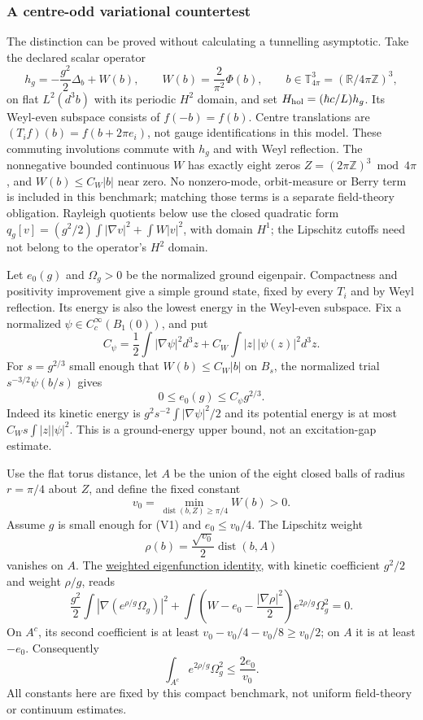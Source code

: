 \documentclass[11pt,a4paper]{article}
\begin{document}
\hypertarget{a-centre-odd-variational-countertest}{%
\subsubsection{A centre-odd variational
countertest}\label{a-centre-odd-variational-countertest}}

The distinction can be proved without calculating a tunnelling
asymptotic. Take the declared scalar operator
\[h_g=-\frac{g^2}{2}\Delta_b+W(b),\qquad
W(b)=\frac{2}{\pi^2}\Phi(b),\qquad
b\in\mathbb T_{4\pi}^3=(\mathbb R/4\pi\mathbb Z)^3,\] on flat
\(L^2(d^3b)\) with its periodic \(H^2\) domain, and set
\(H_{\rm hol}=(\hbar c/L)h_g\). Its Weyl-even subspace consists of
\(f(-b)=f(b)\). Centre translations are \((T_if)(b)=f(b+2\pi e_i)\), not
gauge identifications in this model. These commuting involutions commute
with \(h_g\) and with Weyl reflection. The nonnegative bounded
continuous \(W\) has exactly eight zeros
\(Z=(2\pi\mathbb Z)^3\bmod4\pi\), and \(W(b)\le C_W|b|\) near zero. No
nonzero-mode, orbit-measure or Berry term is included in this benchmark;
matching those terms is a separate field-theory obligation. Rayleigh
quotients below use the closed quadratic form
\(q_g[v]=(g^2/2)\int|\nabla v|^2+\int W|v|^2\), with domain \(H^1\); the
Lipschitz cutoffs need not belong to the operator's \(H^2\) domain.

Let \(e_0(g)\) and \(\Omega_g>0\) be the normalized ground eigenpair.
Compactness and positivity improvement give a simple ground state, fixed
by every \(T_i\) and by Weyl reflection. Its energy is also the lowest
energy in the Weyl-even subspace. Fix a normalized
\(\psi\in C_c^\infty(B_1(0))\), and put
\[C_\psi=\frac12\int|\nabla\psi|^2d^3z
+C_W\int|z|\,|\psi(z)|^2d^3z.\] For \(s=g^{2/3}\) small enough that
\(W(b)\le C_W|b|\) on \(B_s\), the normalized trial
\(s^{-3/2}\psi(b/s)\) gives \[0\le e_0(g)\le C_\psi g^{2/3}. \tag{V1}\]
Indeed its kinetic energy is \(g^2s^{-2}\int|\nabla\psi|^2/2\) and its
potential energy is at most \(C_Ws\int|z||\psi|^2\). This is a
ground-energy upper bound, not an excitation-gap estimate.

Use the flat torus distance, let \(A\) be the union of the eight closed
balls of radius \(r=\pi/4\) about \(Z\), and define the fixed constant
\[v_0=\min_{\operatorname{dist}(b,Z)\ge\pi/4}W(b)>0.\] Assume \(g\) is
small enough for (V1) and \(e_0\le v_0/4\). The Lipschitz weight
\[\rho(b)=\frac{\sqrt{v_0}}2\operatorname{dist}(b,A)\] vanishes on
\(A\). The
\href{ground-state-measure-transfer.md\#weighted-estimates-and-global-magnetic-tails}{weighted
eigenfunction identity}, with kinetic coefficient \(g^2/2\) and weight
\(\rho/g\), reads \[\frac{g^2}{2}\int|\nabla(e^{\rho/g}\Omega_g)|^2
+\int\left(W-e_0-\frac{|\nabla\rho|^2}{2}\right)
 e^{2\rho/g}\Omega_g^2=0.\] On \(A^c\), its second coefficient is at
least \(v_0-v_0/4-v_0/8\ge v_0/2\); on \(A\) it is at least \(-e_0\).
Consequently
\[\int_{A^c}e^{2\rho/g}\Omega_g^2\le\frac{2e_0}{v_0}. \tag{V2}\] All
constants here are fixed by this compact benchmark, not uniform
field-theory or continuum estimates.
\end{document}
